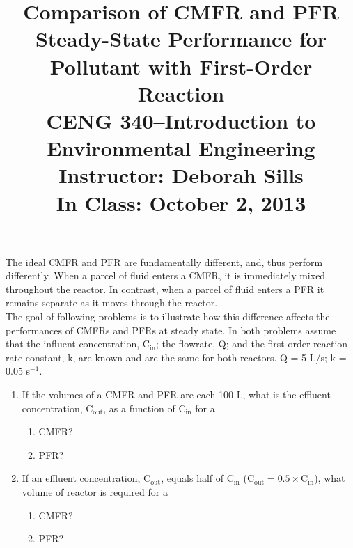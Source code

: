 \documentclass[11pt,letterpaper]{article}
\begin{document}
\setlength{\parindent}{0cm} 



\frenchspacing

\setlength{\textwidth}{6.25in}

\title {\Large{\textbf{Comparison of CMFR and PFR Steady-State Performance for Pollutant with First-Order Reaction}}\\ \large{CENG 340--Introduction to Environmental Engineering\\
Instructor: Deborah Sills\\ \textbf{In Class: October 2, 2013}}}

\author {}
\date {}
\maketitle

\vspace{-1.5cm}
The ideal CMFR and PFR are fundamentally different, and, thus perform differently.  When a parcel of fluid enters a CMFR, it is immediately mixed throughout the reactor.  In contrast, when a parcel of fluid enters a PFR it remains separate as it moves through the reactor.\\

The goal of following problems is to illustrate how this difference affects the performances of CMFRs and PFRs at steady state.  In both problems assume that the influent concentration, C$\mathrm{_{in}}$; the flowrate, Q; and the first-order reaction rate constant, k, are known and are the same for both reactors. Q = 5 L/s; k = 0.05 s$^{-1}$.

\begin{enumerate}
\item If the volumes of a CMFR and PFR are each 100 L, what is the effluent concentration, C$\mathrm{_{out}}$, as a function of C$\mathrm{_{in}}$ for a
\begin{enumerate}
\item CMFR?

\vspace{3in}

\item PFR?

\end{enumerate}

\pagebreak
\item If an effluent concentration, C$\mathrm{_{out}}$, equals half of C$\mathrm{_{in}}$ (C$\mathrm{_{out} = 0.5\times C_{in}}$), what volume of reactor is required for a
\begin{enumerate}
\item CMFR?

\vspace{4in}

\item PFR?

\end{enumerate}

 
\end{enumerate}
\end{document}
